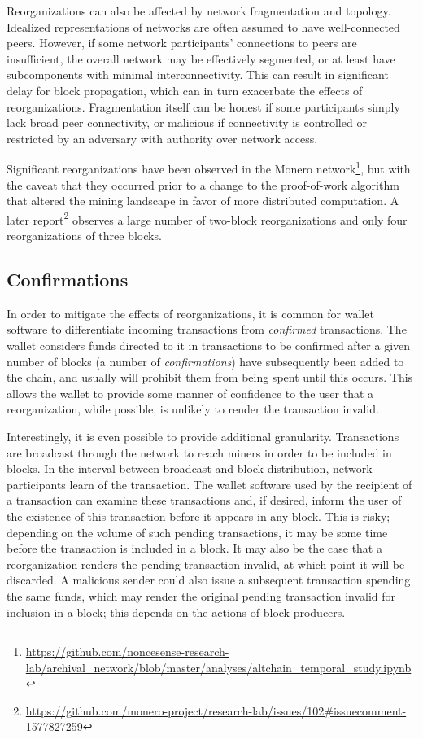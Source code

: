 \documentclass{article}
\theoremstyle{definition}
\begin{document}
Reorganizations can also be affected by network fragmentation and topology.
Idealized representations of networks are often assumed to have well-connected peers.
However, if some network participants' connections to peers are insufficient, the overall network may be effectively segmented, or at least have subcomponents with minimal interconnectivity.
This can result in significant delay for block propagation, which can in turn exacerbate the effects of reorganizations.
Fragmentation itself can be honest if some participants simply lack broad peer connectivity, or malicious if connectivity is controlled or restricted by an adversary with authority over network access.

Significant reorganizations have been observed in the Monero network\footnote{\url{https://github.com/noncesense-research-lab/archival_network/blob/master/analyses/altchain_temporal_study.ipynb}}, but with the caveat that they occurred prior to a change to the proof-of-work algorithm that altered the mining landscape in favor of more distributed computation.
A later report\footnote{\url{https://github.com/monero-project/research-lab/issues/102\#issuecomment-1577827259}} observes a large number of two-block reorganizations and only four reorganizations of three blocks.


\subsection{Confirmations}

In order to mitigate the effects of reorganizations, it is common for wallet software to differentiate incoming transactions from \textit{confirmed} transactions.
The wallet considers funds directed to it in transactions to be confirmed after a given number of blocks (a number of \textit{confirmations}) have subsequently been added to the chain, and usually will prohibit them from being spent until this occurs.
This allows the wallet to provide some manner of confidence to the user that a reorganization, while possible, is unlikely to render the transaction invalid.

Interestingly, it is even possible to provide additional granularity.
Transactions are broadcast through the network to reach miners in order to be included in blocks.
In the interval between broadcast and block distribution, network participants learn of the transaction.
The wallet software used by the recipient of a transaction can examine these transactions and, if desired, inform the user of the existence of this transaction before it appears in any block.
This is risky; depending on the volume of such pending transactions, it may be some time before the transaction is included in a block.
It may also be the case that a reorganization renders the pending transaction invalid, at which point it will be discarded.
A malicious sender could also issue a subsequent transaction spending the same funds, which may render the original pending transaction invalid for inclusion in a block; this depends on the actions of block producers.
\end{document}
